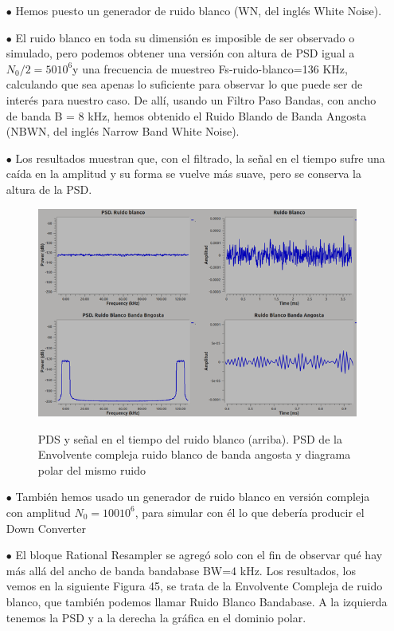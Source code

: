 \begin{itemize}
	
	\item [$\bullet$] Hemos puesto un generador de ruido blanco (WN, del inglés White Noise).
	\item [$\bullet$] El ruido blanco en toda su dimensión es imposible de ser observado o simulado, pero podemos obtener una versión con altura de PSD igual a $N_0/2=50 10^{6}$y una frecuencia de muestreo Fs-ruido-blanco=136 KHz, calculando que sea apenas lo suficiente para observar lo que puede ser de interés para nuestro caso. De allí, usando un Filtro Paso Bandas, con ancho de banda B = 8 kHz, hemos obtenido el Ruido Blando de Banda Angosta (NBWN, del inglés Narrow Band White Noise). 
	\item [$\bullet$] Los resultados muestran que, con el filtrado, la señal en el tiempo sufre una caída en la amplitud y su forma se vuelve más suave, pero se conserva la altura de la PSD.\\
	
	\vspace{400px}
	
	\begin{figure}[h!]
		\captionsetup{justification = raggedright, singlelinecheck = false}
		\caption{PDS y señal en el tiempo del ruido blanco (arriba). PSD de la Envolvente compleja ruido blanco de banda angosta y diagrama polar del mismo ruido} 
		\centering
		\includegraphics[scale=1]{Imagenes/Ruido-blanco.png}
		\label{fig:Ruido-blanco}
	\end{figure}
	
	
	\item [$\bullet$] También hemos usado un generador de ruido blanco en versión compleja con amplitud $N_0=100 10^{6}$, para simular con él lo que debería producir el Down Converter
	\item [$\bullet$] El bloque Rational Resampler se agregó solo con el fin de observar qué hay más allá del ancho de banda bandabase BW=4 kHz. Los resultados, los vemos en la siguiente Figura 45, se trata de la Envolvente Compleja de ruido blanco, que también podemos llamar Ruido Blanco Bandabase. A la izquierda tenemos la PSD y a la derecha la gráfica en el dominio polar.
	
\end{itemize}

